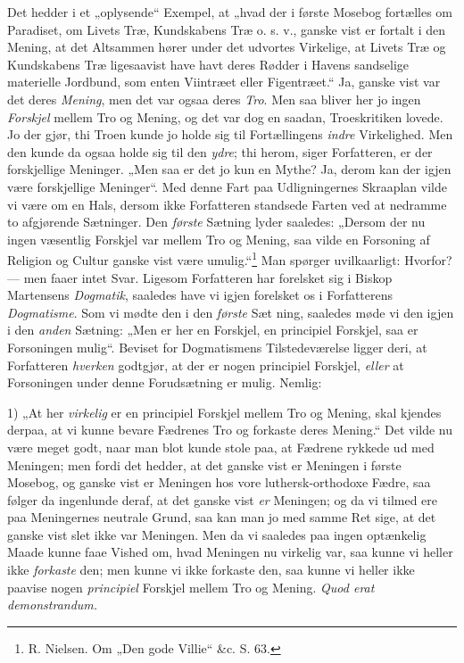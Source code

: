 \documentclass[12pt,a4paper]{book}
\newcommand{\opage}[1]{\marginnote{\footnotesize\textit{[#1]}}}
\begin{document}
\opage{82}\setcounter{footnote}{0}%
Det hedder i et „oplysende“ Exempel, at „hvad
der i første Mosebog fortælles om Paradiset, om Livets
Træ, Kundskabens Træ o. s. v., ganske vist er fortalt
i den Mening, at det Altsammen hører under det
udvortes Virkelige, at Livets Træ og Kundskabens Træ
ligesaavist have havt deres Rødder i Havens sandselige
materielle Jordbund, som enten Viintræet eller Figentræet.“
Ja, ganske vist var det deres \emph{Mening}, men
det var ogsaa deres \emph{Tro}. Men saa bliver her jo ingen
\emph{Forskjel} mellem Tro og Mening, og det var dog
en saadan, Troeskritiken lovede. Jo der gjør, thi
Troen kunde jo holde sig til Fortællingens \emph{indre} Virkelighed.
Men den kunde da ogsaa holde sig til den
\emph{ydre}; thi herom, siger Forfatteren, er der forskjellige
Meninger. „Men saa er det jo kun en Mythe? Ja,
derom kan der igjen være forskjellige Meninger“. Med
denne Fart paa Udligningernes Skraaplan vilde vi
være om en Hals, dersom ikke Forfatteren standsede
Farten ved at nedramme to afgjørende Sætninger.
Den \emph{første} Sætning lyder saaledes: „Dersom der nu
ingen væsentlig Forskjel var mellem Tro og Mening,
saa vilde en Forsoning af Religion og Cultur ganske
vist være umulig.“\footnote{R. Nielsen. Om „Den gode Villie“ \&c. S. 63.} Man spørger uvilkaarligt: Hvorfor?
--- men faaer intet Svar. Ligesom Forfatteren
har forelsket sig i Biskop Martensens \emph{Dogmatik},
saaledes have vi igjen forelsket os i Forfatterens \emph{Dogmatisme}.
Som vi mødte den i den \emph{første} Sæt%
\opage{83}\setcounter{footnote}{0}%
ning, saaledes møde vi den igjen i den \emph{anden} Sætning:
„Men er her en Forskjel, en principiel Forskjel,
saa er Forsoningen mulig“. Beviset for Dogmatismens
Tilstedeværelse ligger deri, at Forfatteren \emph{hverken}
godtgjør, at der er nogen principiel Forskjel, \emph{eller}
at Forsoningen under denne Forudsætning er mulig.
Nemlig:

1) „At her \emph{virkelig} er en principiel Forskjel mellem
Tro og Mening, skal kjendes derpaa, at vi kunne bevare Fædrenes
Tro og forkaste deres Mening.“ Det vilde nu være
meget godt, naar man blot kunde stole paa, at Fædrene rykkede
ud med Meningen; men fordi det hedder, at det ganske
vist er Meningen i første Mosebog, og ganske vist
er Meningen hos vore luthersk-orthodoxe Fædre, saa
følger da ingenlunde deraf, at det ganske vist \emph{er}
Meningen; og da vi tilmed ere paa Meningernes neutrale
Grund, saa kan man jo med samme Ret sige,
at det ganske vist slet ikke var Meningen. Men da
vi saaledes paa ingen optænkelig Maade kunne faae
Vished om, hvad Meningen nu virkelig var, saa kunne
vi heller ikke \emph{forkaste} den; men kunne vi ikke forkaste
den, saa kunne vi heller ikke paavise nogen \emph{principiel}
Forskjel mellem Tro og Mening. \textit{Quod erat demonstrandum.}
\end{document}
